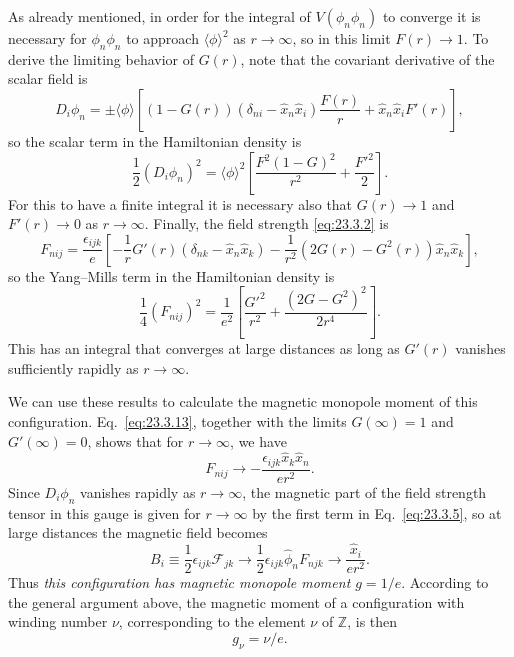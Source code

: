 As already mentioned, in order for the integral of $V(\phi_n\phi_n)$ to
converge it is necessary for $\phi_n\phi_n$ to approach
$\langle\phi\rangle^2$ as $r\to\infty$, so in this limit $F(r)\to1$. To
derive the limiting behavior of $G(r)$, note that the covariant derivative
of the scalar field is
\begin{equation}
 D_i\phi_n=\pm\langle\phi\rangle\left[
 (1-G(r))(\delta_{ni}-\hat x_n\hat x_i)\frac{F(r)}r
 +\hat x_n\hat x_iF'(r)\right],
 \tag{23.3.11}\label{eq:23.3.11}
\end{equation}
so the scalar term in the Hamiltonian density is
\begin{equation}
 \frac12(D_i\phi_n)^2
 =\langle\phi\rangle^2\left[
 \frac{F^2(1-G)^2}{r^2}+\frac{F'^2}{2}\right].
 \tag{23.3.12}\label{eq:23.3.12}
\end{equation}
For this to have a finite integral it is necessary also that $G(r)\to1$
and $F'(r)\to0$ as $r\to\infty$. Finally, the field strength
\eqref{eq:23.3.2} is
\begin{equation}
 F_{nij}=\frac{\epsilon_{ijk}}e\left[
 -\frac1rG'(r)(\delta_{nk}-\hat x_n\hat x_k)
 -\frac1{r^2}(2G(r)-G^2(r))\hat x_n\hat x_k\right],
 \tag{23.3.13}\label{eq:23.3.13}
\end{equation}
so the Yang--Mills term in the Hamiltonian density is
\begin{equation}
 \frac14(F_{nij})^2=\frac1{e^2}\left[
 \frac{G'^2}{r^2}+\frac{(2G-G^2)^2}{2r^4}\right].
 \tag{23.3.14}\label{eq:23.3.14}
\end{equation}
This has an integral that converges at large distances as long as $G'(r)$
vanishes sufficiently rapidly as $r\to\infty$.

We can use these results to calculate the magnetic monopole moment of this
configuration. Eq.~\eqref{eq:23.3.13}, together with the limits
$G(\infty)=1$ and $G'(\infty)=0$, shows that for $r\to\infty$, we have
\begin{equation}
 F_{nij}\longrightarrow
 -\frac{\epsilon_{ijk}\hat x_k\hat x_n}{er^2}.
 \tag{23.3.15}\label{eq:23.3.15}
\end{equation}
Since $D_i\phi_n$ vanishes rapidly as $r\to\infty$, the magnetic part of
the field strength tensor in this gauge is given for $r\to\infty$ by the
first term in Eq.~\eqref{eq:23.3.5}, so at large distances the magnetic
field becomes
\begin{equation}
 B_i\equiv\frac12\epsilon_{ijk}\mathcal F_{jk}
 \longrightarrow\frac12\epsilon_{ijk}\hat\phi_nF_{njk}
 \longrightarrow\frac{\hat x_i}{er^2}.
 \tag{23.3.16}\label{eq:23.3.16}
\end{equation}
Thus \emph{this configuration has magnetic monopole moment $g=1/e$}.
According to the general argument above, the magnetic moment of a
configuration with winding number $\nu$, corresponding to the element
$\nu$ of $\mathbb Z$, is then
\begin{equation}
 g_\nu=\nu/e.
 \tag{23.3.17}\label{eq:23.3.17}
\end{equation}

